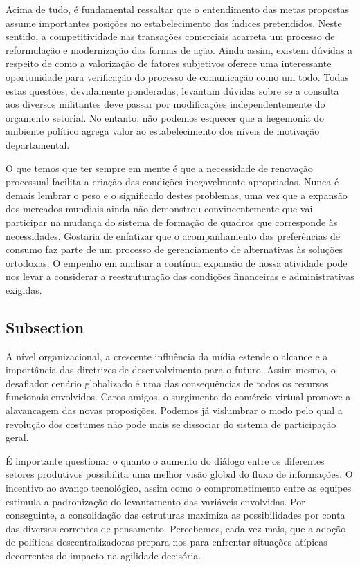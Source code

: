 \documentclass[a5paper,10pt]{udesc}
\begin{document}
Acima de tudo, é fundamental ressaltar que o entendimento das metas propostas assume importantes posições no estabelecimento dos índices pretendidos. Neste sentido, a competitividade nas transações comerciais acarreta um processo de reformulação e modernização das formas de ação. Ainda assim, existem dúvidas a respeito de como a valorização de fatores subjetivos oferece uma interessante oportunidade para verificação do processo de comunicação como um todo. Todas estas questões, devidamente ponderadas, levantam dúvidas sobre se a consulta aos diversos militantes deve passar por modificações independentemente do orçamento setorial. No entanto, não podemos esquecer que a hegemonia do ambiente político agrega valor ao estabelecimento dos níveis de motivação departamental. 

          O que temos que ter sempre em mente é que a necessidade de renovação processual facilita a criação das condições inegavelmente apropriadas. Nunca é demais lembrar o peso e o significado destes problemas, uma vez que a expansão dos mercados mundiais ainda não demonstrou convincentemente que vai participar na mudança do sistema de formação de quadros que corresponde às necessidades. Gostaria de enfatizar que o acompanhamento das preferências de consumo faz parte de um processo de gerenciamento de alternativas às soluções ortodoxas. O empenho em analisar a contínua expansão de nossa atividade pode nos levar a considerar a reestruturação das condições financeiras e administrativas exigidas. 


\subsection{Subsection}

          A nível organizacional, a crescente influência da mídia estende o alcance e a importância das diretrizes de desenvolvimento para o futuro. Assim mesmo, o desafiador cenário globalizado é uma das consequências de todos os recursos funcionais envolvidos. Caros amigos, o surgimento do comércio virtual promove a alavancagem das novas proposições. Podemos já vislumbrar o modo pelo qual a revolução dos costumes não pode mais se dissociar do sistema de participação geral. 

          É importante questionar o quanto o aumento do diálogo entre os diferentes setores produtivos possibilita uma melhor visão global do fluxo de informações. O incentivo ao avanço tecnológico, assim como o comprometimento entre as equipes estimula a padronização do levantamento das variáveis envolvidas. Por conseguinte, a consolidação das estruturas maximiza as possibilidades por conta das diversas correntes de pensamento. Percebemos, cada vez mais, que a adoção de políticas descentralizadoras prepara-nos para enfrentar situações atípicas decorrentes do impacto na agilidade decisória. 
\end{document}
